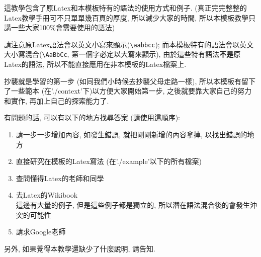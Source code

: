 
%

這教學包含了原Latex和本模板特有的語法的使用方式和例子. (真正完完整整的Latex教學手冊可不只單單幾百頁的厚度, 所以減少大家的時間, 所以本模板教學只講一些大家100\%會需要使用的語法)

請注意原Latex語法會以英文小寫來顯示(\verb|\aabbcc|); 而本模板特有的語法會以英文大小寫混合(\verb|\AaBbCc|, 第一個字必定以大寫來顯示), 由於這些特有語法\textbf{不是}原Latex的語法, 所以不能直接應用在非本模板的Latex檔案上.

抄襲就是學習的第一步 (如同我們小時候去抄襲父母走路一樣), 所以本模板有留下了一些範本 (在'./context'下)以方便大家開始第一步, 之後就要靠大家自己的努力和實作, 再加上自己的探索能力了.

有問題的話, 可以有以下的地方找尋答案 (請使用這順序):
\begin{enumerate}
  \item 請一步一步增加內容, 如發生錯誤, 就把剛剛新增的內容拿掉, 以找出錯誤的地方
  \item 直接研究在模板的Latex寫法 (在'./example'以下的所有檔案)
  \item 查問懂得Latex的老師和同學 %
  \item 去Latex的Wikibook\\
        這邊有大量的例子, 但是這些例子都是獨立的, 所以潛在語法混合後的會發生沖突的可能性
  \item 請求Google老師 %
\end{enumerate}

另外, 如果覺得本教學還缺少了什麼說明, 請告知.

